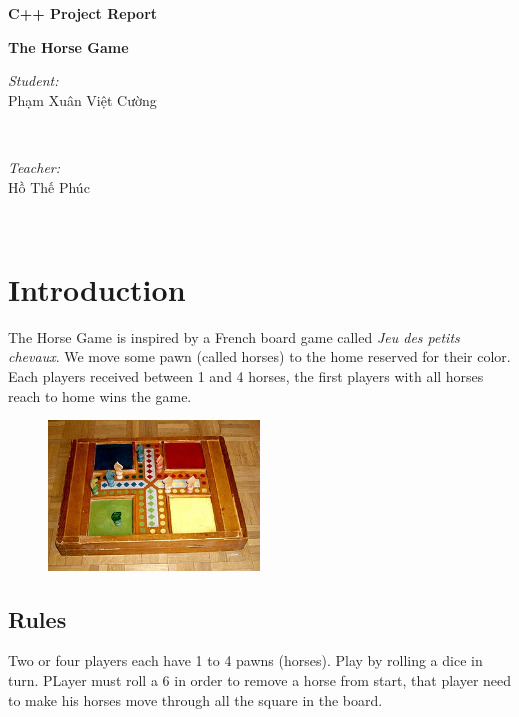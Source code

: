 \documentclass{article}
\begin{document}
\begin{titlepage}
	\begin{center}
		\Huge
		\textbf{C++ Project Report}

		\vspace{0.5cm}
		\Large
		\textbf{The Horse Game}

		\vspace{10cm}
		\begin{minipage}{0.4\textwidth}
			\begin{flushleft} \large
				\emph{Student:}\\
				Phạm Xuân Việt Cường
			\end{flushleft}
		\end{minipage}
		~
		\begin{minipage}{0.4\textwidth}
			\begin{flushright} \large
				\emph{Teacher:} \\
				Hồ Thế Phúc
			\end{flushright}
		\end{minipage}\\[2cm]
	\end{center}
\end{titlepage}

\newpage
\tableofcontents

\newpage
\section{Introduction}
The Horse Game is inspired by a French board game called \emph{Jeu des petits chevaux}. We move some pawn (called horses) to the home reserved for their color. Each players received between 1 and 4 horses, the first players with all horses reach to home wins the game.

\begin{figure}[h]
	\centering
	\includegraphics[width=0.5\textwidth]{small-horses}
	\label{fig:small-horses}
\end{figure}

\subsection{Rules}
Two or four players each have 1 to 4 pawns (horses). Play by rolling a dice in turn. PLayer must roll a 6 in order to remove a horse from start, that player need to make his horses move through all the square in the board.
\end{document}
